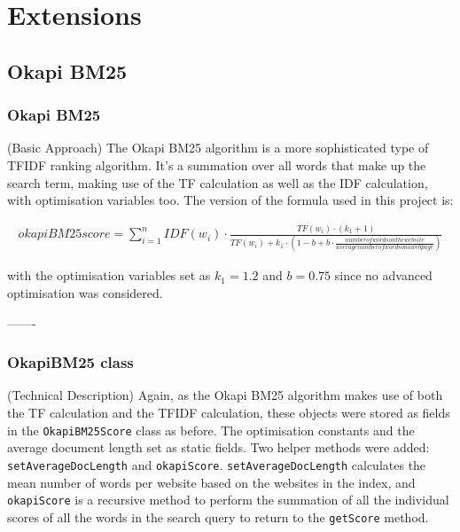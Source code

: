 \chapter{Extensions}


\section{Okapi BM25}

\subsection{Okapi BM25} (Basic Approach)
The Okapi BM25 algorithm is a more sophisticated type of TFIDF ranking algorithm.
It's a summation over all words that make up the search term, making use of the TF calculation as well as the IDF calculation, with optimisation variables too.
The version of the formula used in this project is:

\begin{align*}
    okapi BM 25 score = \sum_{i=1}^n IDF(w_i) \cdot \frac{TF(w_i)\cdot (k_1 + 1)}{TF(w_i) + k_1\cdot(1 - b + b\cdot \frac{number of words on the website}{average number of words on a webpage})}
\end{align*}

with the optimisation variables set as $k_1 = 1.2$ and $b = 0.75$ since no advanced optimisation was considered.

-------

\subsection{OkapiBM25 class} (Technical Description)
Again, as the Okapi BM25 algorithm makes use of both the TF calculation and the TFIDF calculation, these objects were stored as fields in the {\tt OkapiBM25Score} class as before.
The optimisation constants and the average document length set as static fields.
Two helper methods were added: {\tt setAverageDocLength} and {\tt okapiScore}. {\tt setAverageDocLength} calculates the mean number of words per website based on the websites in the index, and {\tt okapiScore} is a recursive method to perform the summation of all the individual scores of all the words in the search query to return to the {\tt getScore} method.

